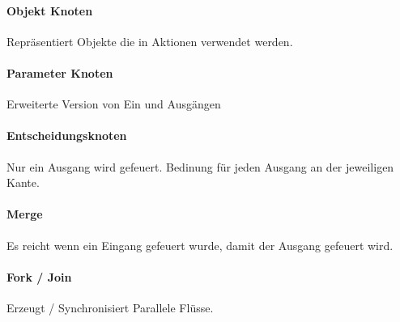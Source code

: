 \paragraph{Objekt Knoten}
Repräsentiert Objekte die in Aktionen verwendet werden.


\paragraph{Parameter Knoten}
Erweiterte Version von Ein und Ausgängen


\paragraph{Entscheidungsknoten}
Nur ein Ausgang wird gefeuert. Bedinung für jeden Ausgang an der jeweiligen Kante.


\paragraph{Merge}
Es reicht wenn ein Eingang gefeuert wurde, damit der Ausgang gefeuert wird.


\paragraph{Fork / Join}
Erzeugt / Synchronisiert Parallele Flüsse. 



